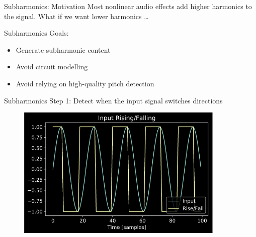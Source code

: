 \begin{frame}
\end{frame}

\begin{frame}{Subharmonics: Motivation}
    Most nonlinear audio effects add higher harmonics to the signal.
    \newline\newline
    What if we want lower harmonics \dots
\end{frame}

\begin{frame}{Subharmonics}
    Goals:
    \vspace{3ex}
    \begin{itemize}
        \item Generate subharmonic content
        \item Avoid circuit modelling
        \item Avoid relying on high-quality pitch detection
    \end{itemize}
\end{frame}

\begin{frame}{Subharmonics}
    Step 1: Detect when the input signal switches directions
    \begin{figure}
        \centering
        \includegraphics[height=2.5in]{../Subharmonics/Pics/rise_fall.png}
    \end{figure}
\end{frame}

